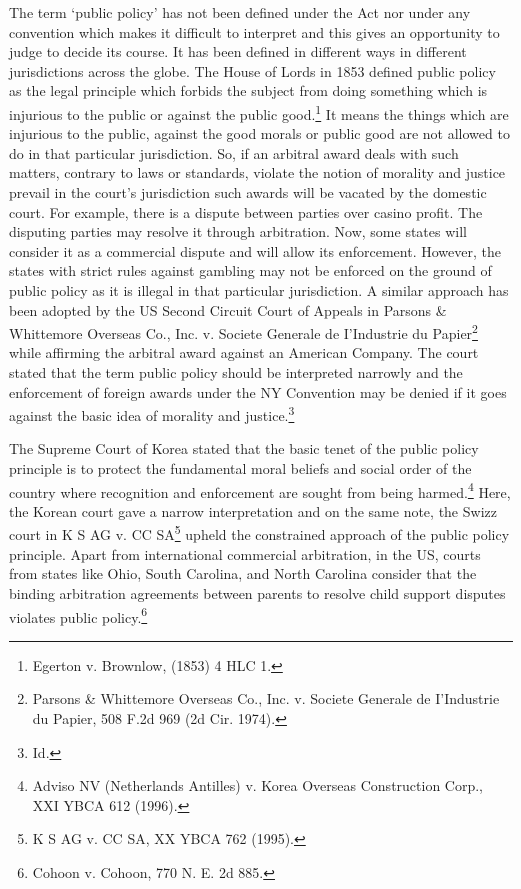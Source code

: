 \begin{multicols}{2}
\vspace{-.1cm}

\noi
The term ‘public policy’ has not been defined under the Act nor under any convention which
makes it difficult to interpret and this gives an opportunity to judge to decide its course. It has
been defined in different ways in different jurisdictions across the globe. The House of Lords
in 1853 defined public policy as the legal principle which forbids the subject from doing
something which is injurious to the public or against the public good.\footnote{Egerton v. Brownlow, (1853) 4 HLC 1.} It means the things which are injurious to the public, against the good morals or public good are not allowed to do in that particular jurisdiction. So, if an arbitral award deals with such matters, contrary to laws or standards, violate the notion of morality and justice prevail in the court’s jurisdiction
such awards will be vacated by the domestic court. For example, there is a dispute between
parties over casino profit. The disputing parties may resolve it through arbitration. Now, some
states will consider it as a commercial dispute and will allow its enforcement. However, the
states with strict rules against gambling may not be enforced on the ground of public policy
as it is illegal in that particular jurisdiction. A similar approach has been adopted by the US
Second Circuit Court of Appeals in Parsons \& Whittemore Overseas Co., Inc. v. Societe
Generale de I’Industrie du Papier\footnote{Parsons \& Whittemore Overseas Co., Inc. v. Societe Generale de I’Industrie du Papier, 508 F.2d 969 (2d Cir. 1974).} while affirming the arbitral award against an American Company. The court stated that the term public policy should be interpreted narrowly and the enforcement of foreign awards under the NY Convention may be denied if it goes against the basic idea of morality and justice.\footnote{Id.}

\vspace{-.1cm}

\noi
The Supreme Court of Korea stated that the basic tenet of the public policy principle is to
protect the fundamental moral beliefs and social order of the country where recognition and
enforcement are sought from being harmed.\footnote{Adviso NV (Netherlands Antilles) v. Korea Overseas Construction Corp., XXI YBCA 612 (1996).} Here, the Korean court gave a narrow
interpretation and on the same note, the Swizz court in K S AG v. CC SA\footnote{K S AG v. CC SA, XX YBCA 762 (1995).} upheld the constrained approach of the public policy principle. Apart from international commercial arbitration, in the US, courts from states like Ohio, South Carolina, and North Carolina consider that the binding arbitration agreements between parents to resolve child support disputes violates public policy.\footnote{Cohoon v. Cohoon, 770 N. E. 2d 885.}


\end{multicols}
